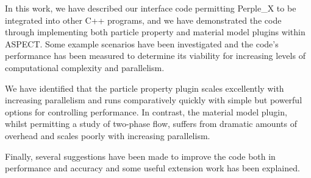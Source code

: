 In this work, we have described our interface code permitting Perple\_X to be integrated into other C++ programs, and we have demonstrated the code through implementing both particle property and material model plugins within ASPECT.
Some example scenarios have been investigated and the code's performance has been measured to determine its viability for increasing levels of computational complexity and parallelism.

We have identified that the particle property plugin scales excellently with increasing parallelism and runs comparatively quickly with simple but powerful options for controlling performance.
In contrast, the material model plugin, whilst permitting a study of two-phase flow, suffers from dramatic amounts of overhead and scales poorly with increasing parallelism.

Finally, several suggestions have been made to improve the code both in performance and accuracy and some useful extension work has been explained.